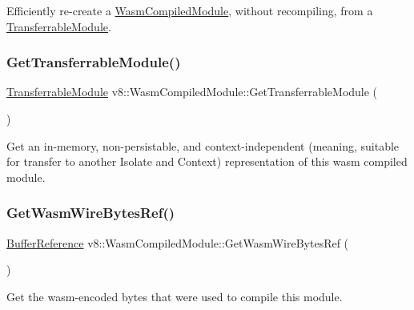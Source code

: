 Efficiently re-\/create a \mbox{\hyperlink{classv8_1_1WasmCompiledModule}{Wasm\+Compiled\+Module}}, without recompiling, from a \mbox{\hyperlink{classv8_1_1WasmCompiledModule_1_1TransferrableModule}{Transferrable\+Module}}. \mbox{\label{classv8_1_1WasmCompiledModule_a5872dd7762bf1c1ebcef833d8356f6ad}} 
\subsubsection{\texorpdfstring{Get\+Transferrable\+Module()}{GetTransferrableModule()}}
{\footnotesize\ttfamily \mbox{\hyperlink{classv8_1_1WasmCompiledModule_1_1TransferrableModule}{Transferrable\+Module}} v8\+::\+Wasm\+Compiled\+Module\+::\+Get\+Transferrable\+Module (\begin{DoxyParamCaption}{ }\end{DoxyParamCaption})}

Get an in-\/memory, non-\/persistable, and context-\/independent (meaning, suitable for transfer to another Isolate and Context) representation of this wasm compiled module. \mbox{\label{classv8_1_1WasmCompiledModule_ad889c2d766016ebf74b7093e8b210aa2}} 
\subsubsection{\texorpdfstring{Get\+Wasm\+Wire\+Bytes\+Ref()}{GetWasmWireBytesRef()}}
{\footnotesize\ttfamily \mbox{\hyperlink{structv8_1_1WasmCompiledModule_1_1BufferReference}{Buffer\+Reference}} v8\+::\+Wasm\+Compiled\+Module\+::\+Get\+Wasm\+Wire\+Bytes\+Ref (\begin{DoxyParamCaption}{ }\end{DoxyParamCaption})}

Get the wasm-\/encoded bytes that were used to compile this module. \mbox{\label{classv8_1_1WasmCompiledModule_a56ba174cfc319056ecdfc870e6c9d832}} 
